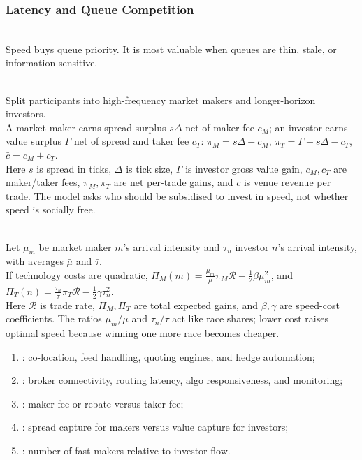 \subsubsection{Latency and Queue Competition}

\begin{principle} \\
Speed buys queue priority. It is most valuable when queues are thin, stale, or information-sensitive.
\end{principle}

\begin{model} \\
Split participants into high-frequency market makers and longer-horizon investors.\\
A market maker earns spread surplus $s\Delta$ net of maker fee $c_M$; an investor earns value surplus $\Gamma$ net of spread and taker fee $c_T$: $\pi_M=s\Delta-c_M$, $\pi_T=\Gamma-s\Delta-c_T$, $\bar{c}=c_M+c_T$.\\
Here $s$ is spread in ticks, $\Delta$ is tick size, $\Gamma$ is investor gross value gain, $c_M,c_T$ are maker/taker fees, $\pi_M,\pi_T$ are net per-trade gains, and $\bar{c}$ is venue revenue per trade. The model asks who should be subsidised to invest in speed, not whether speed is socially free.
\end{model}

\begin{mechanism} \\
Let $\mu_m$ be market maker $m$'s arrival intensity and $\tau_n$ investor $n$'s arrival intensity, with averages $\bar{\mu}$ and $\bar{\tau}$.\\
If technology costs are quadratic, $\Pi_M(m)=\frac{\mu_m}{\bar{\mu}}\pi_M\mathcal{R}-\frac{1}{2}\beta\mu_m^2$, and $\Pi_T(n)=\frac{\tau_n}{\bar{\tau}}\pi_T\mathcal{R}-\frac{1}{2}\gamma\tau_n^2$.\\
Here $\mathcal{R}$ is trade rate, $\Pi_M,\Pi_T$ are total expected gains, and $\beta,\gamma$ are speed-cost coefficients. The ratios $\mu_m/\bar{\mu}$ and $\tau_n/\bar{\tau}$ act like race shares; lower cost raises optimal speed because winning one more race becomes cheaper.
\end{mechanism}

\begin{taxonomy} 
\begin{enumerate}[label=\roman*.]
\setlength{\itemsep}{0pt}
\item {}: co-location, feed handling, quoting engines, and hedge automation;
\item {}: broker connectivity, routing latency, algo responsiveness, and monitoring;
\item {}: maker fee or rebate versus taker fee;
\item {}: spread capture for makers versus value capture for investors;
\item {}: number of fast makers relative to investor flow.
\end{enumerate}
\end{taxonomy}

